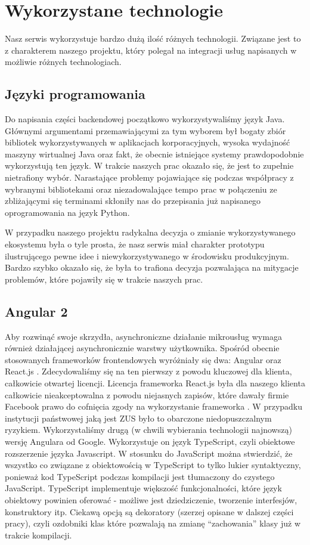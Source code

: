 \documentclass[licencjacka]{pracamgr}
\begin{document}
\chapter{Wykorzystane technologie}

Nasz serwis wykorzystuje bardzo dużą ilość różnych technologii. Związane jest to
z charakterem naszego projektu, który polegał na integracji usług napisanych w
możliwie różnych technologiach.

\section{Języki programowania}


Do napisania części backendowej początkowo wykorzystywaliśmy język Java. Głównymi
argumentami przemawiającymi za tym wyborem był bogaty zbiór bibliotek wykorzystywanych
w aplikacjach korporacyjnych, wysoka wydajność maszyny wirtualnej Java oraz fakt, że
obecnie istniejące systemy prawdopodobnie wykorzystują ten język. W trakcie naszych
prac okazało się, że jest to zupełnie nietrafiony wybór. Narastające problemy
pojawiające się podczas współpracy z wybranymi bibliotekami oraz niezadowalające
tempo prac w połączeniu ze zbliżającymi się terminami skłoniły nas do przepisania
już napisanego oprogramowania na język Python.

W przypadku naszego projektu radykalna decyzja o zmianie wykorzystywanego ekosystemu
była o tyle prosta, że nasz serwis miał charakter prototypu ilustrującego pewne
idee i niewykorzystywanego w środowisku produkcyjnym. Bardzo szybko okazało się, że
była to trafiona decyzja pozwalająca na mitygacje problemów, które pojawiły się w
trakcie naszych prac.

\section{Angular 2}

Aby rozwinąć swoje skrzydła, asynchroniczne działanie mikrousług wymaga również działającej asynchronicznie warstwy użytkownika.
Spośród obecnie stosowanych frameworków frontendowych wyróżniały się dwa: Angular \cite{angular2} oraz React.js \cite{react}.
Zdecydowaliśmy się na ten pierwszy z powodu kluczowej dla klienta, całkowicie otwartej licencji.
Licencja frameworka React.js była dla naszego klienta całkowicie nieakceptowalna
z powodu niejasnych zapisów, które dawały firmie Facebook prawo do cofnięcia zgody
na wykorzystanie frameworka \cite{reactlicense}. W przypadku instytucji państwowej
jaką jest ZUS było to obarczone niedopuszczalnym ryzykiem.
Wykorzystaliśmy drugą (w chwili wybierania technologii najnowszą) wersję Angulara
od Google. Wykorzystuje on język TypeScript, czyli obiektowe rozszerzenie języka Javascript.
W stosunku do JavaScript można stwierdzić, że wszystko co związane z obiektowością
w TypeScript to tylko lukier syntaktyczny, ponieważ kod TypeScript podczas kompilacji
jest tłumaczony do czystego JavaScript. TypeScript implementuje większość
funkcjonalności, które język obiektowy powinien oferować - możliwe jest dziedziczenie,
tworzenie interfesjów, konstruktory itp. Ciekawą opcją są dekoratory (szerzej opisane
w dalszej części pracy), czyli ozdobniki klas które pozwalają na zmianę ``zachowania''
klasy już w trakcie kompilacji.
\end{document}
